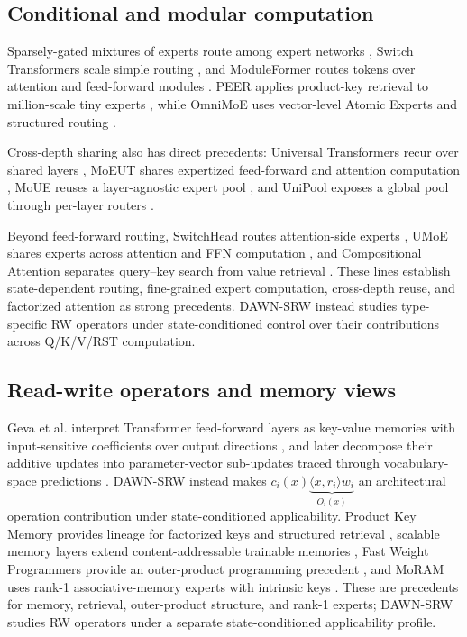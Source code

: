 \documentclass{article}
\newcommand{\DAWN}{DAWN-SRW}
\begin{document}
\subsection{Conditional and modular computation}

Sparsely-gated mixtures of experts route among expert networks
\cite{shazeer2017outrageously}, Switch Transformers scale simple routing
\cite{fedus2022switch}, and ModuleFormer routes tokens over attention and
feed-forward modules \cite{shen2023moduleformer}. PEER applies product-key
retrieval to million-scale tiny experts \cite{he2024mixture}, while OmniMoE uses
vector-level Atomic Experts and structured routing \cite{shi2026omnimoe}.

Cross-depth sharing also has direct precedents: Universal Transformers recur
over shared layers \cite{dehghani2019universal}, MoEUT shares expertized
feed-forward and attention computation \cite{csordas2024moeut}, MoUE reuses a
layer-agnostic expert pool \cite{chen2026mixture}, and UniPool exposes a global
pool through per-layer routers \cite{huang2026unipool}.

Beyond feed-forward routing, SwitchHead routes attention-side experts
\cite{csordas2024switchhead}, UMoE shares experts across attention and FFN
computation \cite{yang2025umoe}, and Compositional Attention separates
query--key search from value retrieval \cite{mittal2022compositional}. These
lines establish state-dependent routing, fine-grained expert computation,
cross-depth reuse, and factorized attention as strong precedents. \DAWN{}
instead studies type-specific RW operators under state-conditioned control over
their contributions across Q/K/V/RST computation.

\subsection{Read-write operators and memory views}

Geva et al. interpret Transformer feed-forward layers as key-value memories with
input-sensitive coefficients over output directions
\cite{geva2021transformer}, and later decompose their additive updates into
parameter-vector sub-updates traced through vocabulary-space predictions
\cite{geva2022transformer}. \DAWN{} instead makes
\(c_i(x)\underbrace{\langle x,\bar r_i\rangle \bar w_i}_{O_i(x)}\) an architectural
operation contribution under state-conditioned applicability. Product Key Memory provides
lineage for factorized keys and structured retrieval \cite{lample2019large},
scalable memory layers extend content-addressable trainable memories
\cite{berges2024memory}, Fast Weight Programmers provide an outer-product
programming precedent \cite{schlag2021linear}, and MoRAM uses rank-1
associative-memory experts with intrinsic keys \cite{lu2026little}. These are
precedents for memory, retrieval, outer-product structure, and rank-1 experts;
\DAWN{} studies RW operators under a separate state-conditioned applicability
profile.
\end{document}
